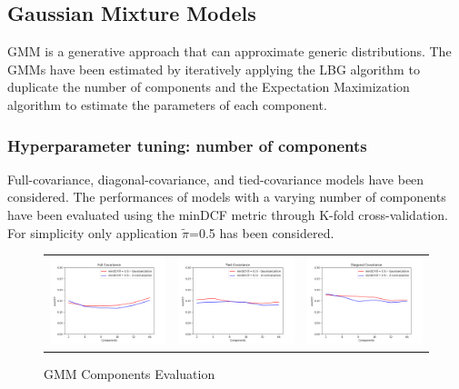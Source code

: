 \documentclass[12pt,a4paper]{article}
\begin{document}
\subsection{Gaussian Mixture Models}

GMM is a generative approach that can approximate generic distributions.
The GMMs have been estimated by iteratively applying the LBG algorithm to duplicate the number of components and the Expectation Maximization algorithm to estimate the parameters of each component.

\subsubsection{Hyperparameter tuning: number of components}

Full-covariance, diagonal-covariance, and tied-covariance models have been considered.
The performances of models with a varying number of components have been evaluated using the minDCF metric through K-fold cross-validation.
For simplicity only application $\tilde{\pi}$=0.5 has been considered.

\begin{figure}[H]
    \caption{GMM Components Evaluation}
    \begin{center}
        \begin{tabular}{ccc}
            \hspace*{-65pt}
            \includegraphics[width = 160pt]{img/evaluation_plots/gmm-components-full-covariance.png} &
            \includegraphics[width = 160pt]{img/evaluation_plots/gmm-components-tied-covariance.png} &
            \includegraphics[width = 160pt]{img/evaluation_plots/gmm-components-diagonal-covariance.png} \\
        \end{tabular}
    \end{center}
\end{figure}
\end{document}
